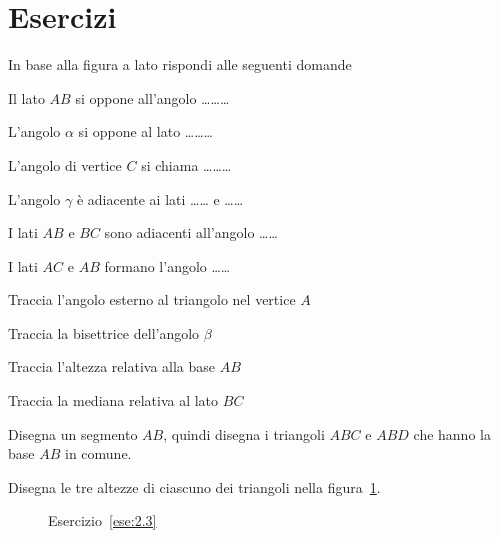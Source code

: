 \section{Esercizi}

\begin{esercizio}
\label{ese:2.1}
In base alla figura a lato rispondi alle seguenti domande\\
\begin{minipage}{.7\linewidth}
\begin{enumeratea}
\item Il lato $AB$ si oppone all'angolo \ldots\ldots\ldots
\item L'angolo $\alpha$ si oppone al lato \ldots\ldots\ldots
\item L'angolo di vertice $C$ si chiama \ldots\ldots\ldots
\item L'angolo $\gamma$ è adiacente ai lati \ldots\ldots{} e \ldots\ldots
\item I lati $AB$ e $BC$ sono adiacenti all'angolo \ldots\ldots
\item I lati $AC$ e $AB$ formano l'angolo \ldots\ldots
\item Traccia l'angolo esterno al triangolo nel vertice $A$
\item Traccia la bisettrice dell'angolo $\beta$
\item Traccia l'altezza relativa alla base $AB$
\item Traccia la mediana relativa al lato $BC$
\end{enumeratea}
\end{minipage}\hfil
\begin{minipage}{.3\linewidth}
  \centering
    
\end{minipage}
\end{esercizio}

\begin{esercizio}
\label{ese:2.2}
Disegna un segmento $AB$, quindi disegna i triangoli $ABC$ e $ABD$ che hanno la base $AB$ in comune.
\end{esercizio}

\begin{esercizio}
\label{ese:2.3}
Disegna le tre altezze di ciascuno dei triangoli nella figura~\ref{fig:ese2.3}.
\end{esercizio}

\begin{figure}[htb]
\centering
\caption{Esercizio~\ref{ese:2.3}}\label{fig:ese2.3}
\end{figure}

